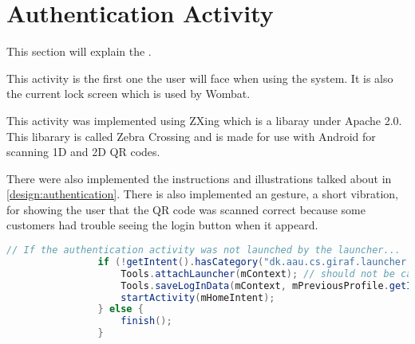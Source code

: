 \section{Authentication Activity}
This section will explain the .


This activity is the first one the user will face when using the \giraf[] system. It is also the current lock screen which is used by Wombat. 

This activity was implemented using ZXing which is a libaray under Apache 2.0. This libarary is called Zebra Crossing and is made for use with Android for scanning 1D and 2D QR codes.

There were also implemented the instructions and illustrations talked about in \autoref{design:authentication}. There is also implemented an gesture, a short vibration, for showing the user that the QR code was scanned correct because some customers had trouble seeing the login button when it appeard.

\begin{lstlisting}[style=sourceCode, language=JAVA, caption=This is code, label=lst:authenticationAcitivity] 
				// If the authentication activity was not launched by the launcher...
				if (!getIntent().hasCategory("dk.aau.cs.giraf.launcher.GIRAF")) {
					Tools.attachLauncher(mContext); // should not be called
					Tools.saveLogInData(mContext, mPreviousProfile.getId());
					startActivity(mHomeIntent);
				} else {
					finish();
				}
\end{lstlisting}
